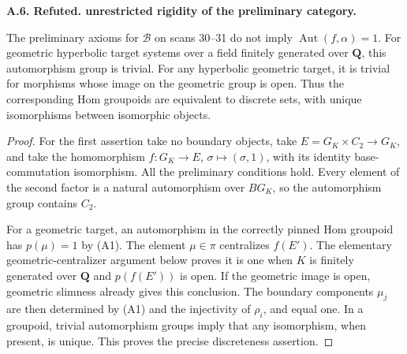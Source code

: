\documentclass[11pt,oneside]{article}
\makeatletter
\newcounter{statementanchor}
\newenvironment{statement}[3]{%
 \refstepcounter{statementanchor}\def\@currentlabel{#1}%
 \par\addvspace{9pt}\noindent
 \textbf{#1. #2. #3.}\par\nobreak\noindent\ignorespaces
}{\par\addvspace{5pt}}
\makeatother
\begin{document}
\begin{statement}{A.6}{Refuted}{unrestricted rigidity of the preliminary category}
\label{st:A.6}
\label{A:abstract-rigidity}
The preliminary axioms for $\mathcal B$ on scans 30--31 do not imply
$\operatorname{Aut}(f,\alpha)=1$.  For geometric hyperbolic target
systems over a field finitely generated over $\mathbf Q$, this
automorphism group is trivial.  For any hyperbolic geometric target,
it is trivial for morphisms whose image on the geometric group is
open.  Thus the corresponding Hom groupoids are equivalent to
discrete sets, with unique isomorphisms between isomorphic objects.
\end{statement}
\begin{proof}
For the first assertion take no boundary objects, take
$E=G_K\times C_2\to G_K$, and take the homomorphism
$f:G_K\to E$, $\sigma\mapsto(\sigma,1)$, with its identity
base-commutation isomorphism.  All the preliminary conditions hold.
Every element of the second factor is a natural automorphism over
$BG_K$, so the automorphism group contains $C_2$.

For a geometric target, an automorphism in the correctly pinned
Hom groupoid has $p(\mu)=1$ by (A1).  The element $\mu\in\pi$
centralizes $f(E')$.  The elementary geometric-centralizer argument
below proves it is one when $K$ is finitely generated over
$\mathbf Q$ and $p(f(E'))$ is open.  If the geometric image is
open, geometric slimness already gives this conclusion.  The
boundary components $\mu_j$ are then determined by (A1) and the
injectivity of $\rho_i$, and equal one.  In a groupoid, trivial
automorphism groups imply that any isomorphism, when present, is
unique.  This proves the precise discreteness assertion.
\end{proof}
\end{document}
